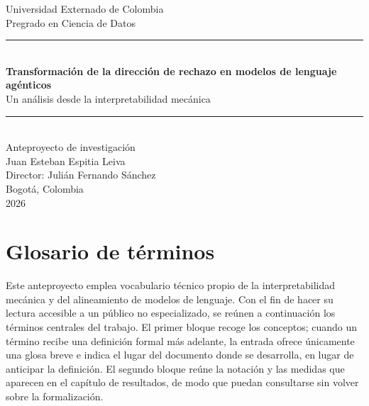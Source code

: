 \documentclass[12pt,a4paper]{article}
\begin{document}
\begin{titlepage}
\centering
\vspace*{1.5cm}

{\sffamily\large\color{gristexto} Universidad Externado de Colombia}\\[0.3cm]
{\sffamily\normalsize\color{gristexto} Pregrado en Ciencia de Datos}\\[2.5cm]

{\color{azulclaro}\rule{\linewidth}{0.4pt}}\\[0.8cm]

{\sffamily\LARGE\bfseries\color{azultitulo}
Transformación de la dirección de rechazo en modelos de lenguaje agénticos\\[0.3cm]}
{\sffamily\large\color{gristexto}
Un análisis desde la interpretabilidad mecánica\\[0.8cm]}

{\color{azulclaro}\rule{\linewidth}{0.4pt}}\\[1.5cm]

{\sffamily\large\color{gristexto} Anteproyecto de investigación}\\[3cm]

{\sffamily\normalsize
Juan Esteban Espitia Leiva}\\[0.5cm]

{\sffamily\normalsize\color{gristexto}
Director: Julián Fernando Sánchez}\\[2cm]

{\sffamily\normalsize\color{gristexto} Bogotá, Colombia \\ 2026}

\vfill
\end{titlepage}

\newpage

\section*{Glosario de términos}

\justifying

Este anteproyecto emplea vocabulario técnico propio de la interpretabilidad mecánica y del alineamiento de modelos de lenguaje. Con el fin de hacer su lectura accesible a un público no especializado, se reúnen a continuación los términos centrales del trabajo. El primer bloque recoge los conceptos; cuando un término recibe una definición formal más adelante, la entrada ofrece únicamente una glosa breve e indica el lugar del documento donde se desarrolla, en lugar de anticipar la definición. El segundo bloque reúne la notación y las medidas que aparecen en el capítulo de resultados, de modo que puedan consultarse sin volver sobre la formalización.
\end{document}
